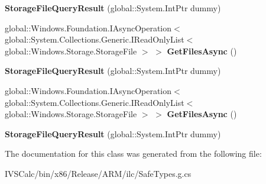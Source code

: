 \begin{DoxyCompactItemize}
{\bfseries Storage\+File\+Query\+Result} (global\+::\+System.\+Int\+Ptr dummy)
\item 
\mbox{\label{class_windows_1_1_storage_1_1_search_1_1_storage_file_query_result_a3c9c23aca5517c18087b5b0200d6de04}} 
global\+::\+Windows.\+Foundation.\+I\+Async\+Operation$<$ global\+::\+System.\+Collections.\+Generic.\+I\+Read\+Only\+List$<$ global\+::\+Windows.\+Storage.\+Storage\+File $>$ $>$ {\bfseries Get\+Files\+Async} ()
\item 
\mbox{\label{class_windows_1_1_storage_1_1_search_1_1_storage_file_query_result_accd8b919bc86f37f4a3609c2d88ab36e}} 
{\bfseries Storage\+File\+Query\+Result} (global\+::\+System.\+Int\+Ptr dummy)
\item 
\mbox{\label{class_windows_1_1_storage_1_1_search_1_1_storage_file_query_result_a3c9c23aca5517c18087b5b0200d6de04}} 
global\+::\+Windows.\+Foundation.\+I\+Async\+Operation$<$ global\+::\+System.\+Collections.\+Generic.\+I\+Read\+Only\+List$<$ global\+::\+Windows.\+Storage.\+Storage\+File $>$ $>$ {\bfseries Get\+Files\+Async} ()
\item 
\mbox{\label{class_windows_1_1_storage_1_1_search_1_1_storage_file_query_result_accd8b919bc86f37f4a3609c2d88ab36e}} 
{\bfseries Storage\+File\+Query\+Result} (global\+::\+System.\+Int\+Ptr dummy)
\end{DoxyCompactItemize}


The documentation for this class was generated from the following file\+:\begin{DoxyCompactItemize}
\item 
I\+V\+S\+Calc/bin/x86/\+Release/\+A\+R\+M/ilc/Safe\+Types.\+g.\+cs\end{DoxyCompactItemize}
